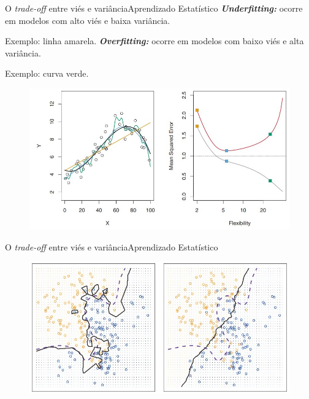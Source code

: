 \documentclass[t]{beamer}
\begin{document}
\begin{ftst}{O \textit{trade-off} entre viés e variância}{{Aprendizado Estatístico}}
\justifying
\textit{\textbf{Underfitting: }}ocorre em modelos com alto viés e baixa variância.

Exemplo: linha amarela.
\vone
\textit{\textbf{Overfitting:}} ocorre em modelos com baixo viés e alta variância.

Exemplo: curva verde.

\begin{figure}
    \centering
    \includegraphics[scale=0.4]{Figuras/slide03_12.jpg}
\end{figure}

\end{ftst}


\begin{ftst}{O \textit{trade-off} entre viés e variância}{{Aprendizado Estatístico}}


\begin{figure}
    \centering
    \includegraphics[scale=0.4]{Figuras/slide03_13.jpg}
\end{figure}

\end{ftst}

\end{document}
